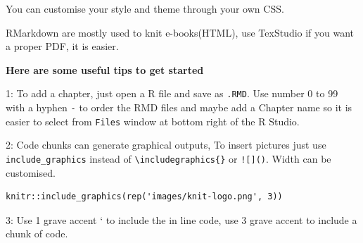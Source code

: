 \documentclass[
]{book}
\begin{document}
You can customise your style and theme through your own CSS.

RMarkdown are mostly used to knit e-books(HTML), use TexStudio if you
want a proper PDF, it is easier.

\textbf{Here are some useful tips to get started}

1: To add a chapter, just open a R file and save as \texttt{.RMD}. Use
number 0 to 99 with a hyphen \texttt{-} to order the RMD files and maybe
add a Chapter name so it is easier to select from \texttt{Files} window
at bottom right of the R Studio.

2: Code chunks can generate graphical outputs, To insert pictures just
use \texttt{include\_graphics} instead of
\texttt{\textbackslash{}includegraphics\{\}} or \texttt{!{[}{]}()}.
Width can be customised.

\begin{verbatim}
knitr::include_graphics(rep('images/knit-logo.png', 3))
\end{verbatim}

3: Use 1 grave accent ` to include the in line code, use 3 grave accent
to include a chunk of code.

\backmatter
\end{document}
